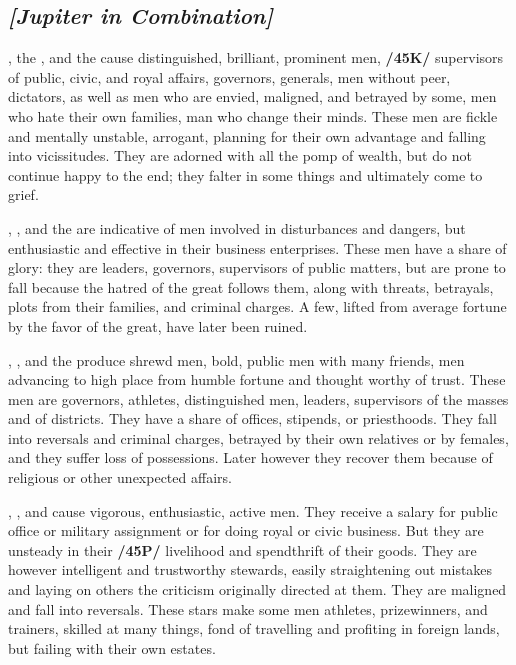 \secbr
\subsection{\textit{[Jupiter in Combination]}}
\Jupiter, the \Sun, and the \Moon\xspace cause distinguished, brilliant, prominent men, \textbf{/45K/} supervisors of
public, civic, and royal affairs, governors, generals, men without peer, dictators, as well as men who are envied, maligned, and betrayed by some, men who hate their own families, man who change their minds. These men are fickle and mentally unstable, arrogant, planning for their own advantage and falling into vicissitudes. They are adorned with all the pomp of wealth, but do not continue happy to the end; they
falter in some things and ultimately come to grief.

\Jupiter, \Mars, and the \Sun\xspace are indicative of men involved in disturbances and dangers, but enthusiastic
and effective in their business enterprises. These men have a share of glory: they are leaders, governors, supervisors of public matters, but are prone to fall because the hatred of the great follows them, along with threats, betrayals, plots from their families, and criminal charges. A few, lifted from average fortune by the favor of the great, have later been ruined.

\Jupiter, \Mars, and the \Moon\xspace produce shrewd men, bold, public men with many friends, men advancing to high place from humble fortune and thought worthy of trust. These men are governors, athletes, distinguished men, leaders, supervisors of the masses and of districts. They have a share of offices, stipends, or priesthoods. They fall into reversals and criminal charges, betrayed by their own relatives or by females, and they suffer loss of possessions. Later however they recover them because of religious or other unexpected affairs.

\Jupiter, \Mars, and \Mercury\xspace cause vigorous, enthusiastic, active men. They receive a salary for public
office or military assignment or for doing royal or civic business. But they are unsteady in their \textbf{/45P/}
livelihood and spendthrift of their goods. They are however intelligent and trustworthy stewards, easily straightening out mistakes and laying on others the criticism originally directed at them. They are maligned and fall into reversals. These stars make some men athletes, prizewinners, and trainers, skilled at many things, fond of travelling and profiting in foreign lands, but failing with their own estates. 

